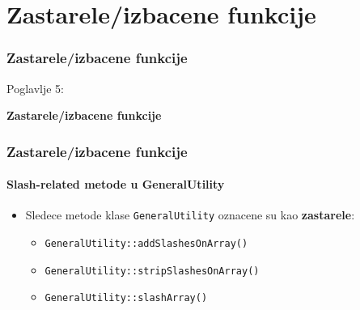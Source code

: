 %

\section{Zastarele/izbacene funkcije}
\begin{frame}[fragile]
	\frametitle{Zastarele/izbacene funkcije}

	\begin{center}\huge{Poglavlje 5:}\end{center}
	\begin{center}\huge{\color{typo3darkgrey}\textbf{Zastarele/izbacene funkcije}}\end{center}

\end{frame}


\begin{frame}[fragile]
	\frametitle{Zastarele/izbacene funkcije}
	\framesubtitle{Slash-related metode u GeneralUtility}

	\begin{itemize}

		\item Sledece metode klase \texttt{GeneralUtility} oznacene su kao \textbf{zastarele}:

			\begin{itemize}
				\item \texttt{GeneralUtility::addSlashesOnArray()}
				\item \texttt{GeneralUtility::stripSlashesOnArray()}
				\item \texttt{GeneralUtility::slashArray()}
			\end{itemize}

	\end{itemize}

\end{frame}

